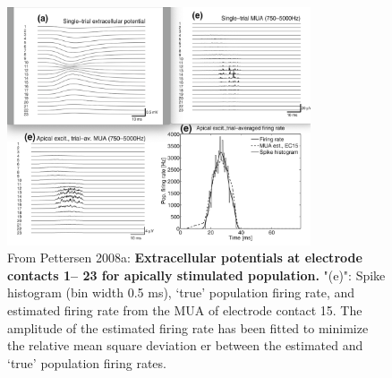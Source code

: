 \begin{figure}[!ht]
\begin{center}
\includegraphics[width=0.8\textwidth]{Figures/Spikes/Spikes-MUA-barrel} 
\end{center}
\caption[]{
From Pettersen 2008a: \textbf{Extracellular potentials at electrode contacts 1-- 23 for apically stimulated population.} 
 "(e)": Spike histogram (bin width 0.5 ms), `true' population firing rate, and estimated firing rate from the MUA of electrode contact 15. The amplitude of the estimated firing rate
has been fitted to minimize the relative mean square deviation er  between the estimated and `true' population firing rates. 
}
\label{fig:Spikes:MUA-ApicalSynapses}
\end{figure}

